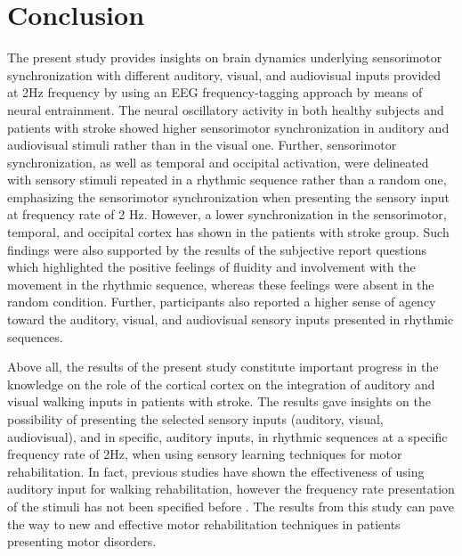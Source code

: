 \chapter{Conclusion}
The present study provides insights on brain dynamics underlying sensorimotor synchronization with different auditory, visual, and audiovisual inputs provided at 2Hz frequency by using an EEG frequency-tagging approach by means of neural entrainment. The neural oscillatory activity in both healthy subjects and patients with stroke showed higher sensorimotor synchronization in auditory and audiovisual stimuli rather than in the visual one. Further, sensorimotor synchronization, as well as temporal and occipital activation, were delineated with sensory stimuli repeated in a rhythmic sequence rather than a random one, emphasizing the sensorimotor synchronization when presenting the sensory input at frequency rate of 2 Hz. 
However, a lower synchronization in the sensorimotor, temporal, and occipital cortex has shown in the patients with stroke group. Such findings were also supported by the results of the subjective report questions which highlighted the positive feelings of fluidity and involvement with the movement in the rhythmic sequence, whereas these feelings were absent in the random condition. Further, participants also reported a higher sense of agency toward the auditory, visual, and audiovisual sensory inputs presented in rhythmic sequences. 

Above all, the results of the present study constitute important progress in the knowledge on the role of the cortical cortex on the integration of auditory and visual walking inputs in patients with stroke. The results gave insights on the possibility of presenting the selected sensory inputs (auditory, visual, audiovisual), and in specific, auditory inputs, in rhythmic sequences at a specific frequency rate of 2Hz, when using sensory learning techniques for motor rehabilitation. In fact, previous studies have shown the effectiveness of using auditory input for walking rehabilitation, however the frequency rate presentation of the stimuli has not been specified before \parencite{Bolognini_2016, Gomez_2020}. The results from this study can pave the way to new and effective motor rehabilitation techniques in patients presenting motor disorders. 

